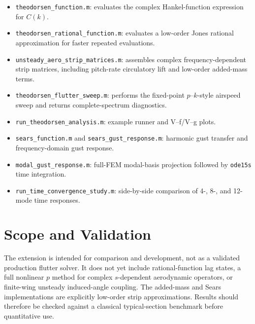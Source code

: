 \documentclass[11pt]{article}
\begin{document}
\begin{itemize}
\item \texttt{theodorsen\_function.m}: evaluates the complex Hankel-function expression
 for $C(k)$.
\item \texttt{theodorsen\_rational\_function.m}: evaluates a low-order Jones rational
 approximation for faster repeated evaluations.
\item \texttt{unsteady\_aero\_strip\_matrices.m}: assembles complex
 frequency-dependent strip matrices, including pitch-rate circulatory lift and
 low-order added-mass terms.
\item \texttt{theodorsen\_flutter\_sweep.m}: performs the fixed-point $p$--$k$-style
 airspeed sweep and returns complete-spectrum diagnostics.
\item \texttt{run\_theodorsen\_analysis.m}: example runner and V--f/V--g plots.
\item \texttt{sears\_function.m} and \texttt{sears\_gust\_response.m}: harmonic gust
 transfer and frequency-domain gust response.
\item \texttt{modal\_gust\_response.m}: full-FEM modal-basis projection followed by
 \texttt{ode15s} time integration.
\item \texttt{run\_time\_convergence\_study.m}: side-by-side comparison of 4-, 8-, and
 12-mode time responses.
\end{itemize}

\section{Scope and Validation}

The extension is intended for comparison and development, not as a validated production
flutter solver. It does not yet include rational-function lag states, a full nonlinear
$p$ method for complex $s$-dependent aerodynamic operators, or finite-wing unsteady
induced-angle coupling. The added-mass and Sears implementations are explicitly
low-order strip approximations. Results should therefore be checked against a classical
typical-section benchmark before quantitative use.
\end{document}
